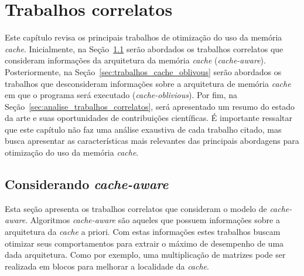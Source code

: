 \chapter{Trabalhos correlatos}
\label{cap:trabalhos_correlatos}

Este capítulo revisa os principais trabalhos de otimização do uso da memória \textit{cache}.
Inicialmente, na Seção~\ref{sec:trabalhos_cache_aware} serão abordados os trabalhos correlatos que consideram informações da arquitetura da memória \textit{cache} (\textit{cache-aware}).
Posteriormente, na Seção~\ref{sec:trabalhos_cache_oblivous} serão abordados os trabalhos que desconsideram informações sobre a arquitetura de memória \textit{cache} em que o programa será executado (\textit{cache-oblivious}).
Por fim, na Seção~\ref{sec:analise_trabalhos_correlatos}, será apresentado um resumo do estado da arte e suas oportunidades de contribuições científicas.
É importante ressaltar que este capítulo não faz uma análise exaustiva de cada trabalho citado, mas busca apresentar as características mais relevantes das principais abordagens para otimização do uso da memória \textit{cache}.

\section{Considerando \textit{cache-aware}}
\label{sec:trabalhos_cache_aware}

Esta seção apresenta os trabalhos correlatos que consideram o modelo de \textit{cache-aware}.
Algoritmos \textit{cache-aware} são aqueles que possuem informações sobre a arquitetura da \textit{cache} a priori.
Com estas informações estes trabalhos buscam otimizar seus comportamentos para extrair o máximo de desempenho de uma dada arquitetura.
Como por exemplo, uma multiplicação de matrizes pode ser realizada em blocos para melhorar a localidade da \textit{cache}.

